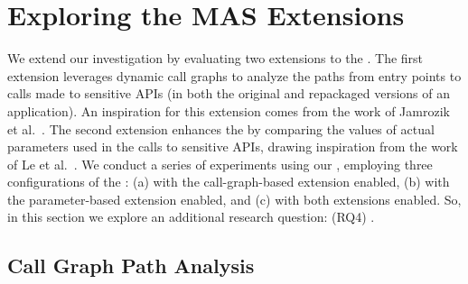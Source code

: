 \section{Exploring the MAS Extensions}



We extend our investigation by evaluating two extensions to the \mas. The first extension leverages dynamic call graphs
to analyze the paths from entry points to calls made to sensitive APIs (in both the original and repackaged versions of an application).
An inspiration for this extension comes from the work of Jamrozik et al.~\cite{DBLP:conf/icse/JamrozikSZ16}.
The second extension enhances the \mas by comparing the values of actual parameters used in the calls to sensitive APIs,
drawing inspiration from the work of Le et al.~\cite{le2018towards}. We conduct a series of experiments using our \cds,
employing three configurations of the \mas: (a) with the call-graph-based extension enabled,
(b) with the parameter-based extension enabled, and (c) with both extensions enabled.
So, in this section we explore an additional research question: (RQ4) \rqe.

\subsection{Call Graph Path Analysis}

